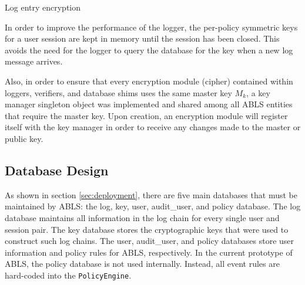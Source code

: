 \documentclass{sig-alternate}
\begin{document}
\begin{algorithm}[h] %
\caption{Log entry encryption} \label{alg:encrypt}
\begin{algorithmic}[1]

\ELSE
\ENDIF
{}
\end{algorithmic}
\end{algorithm}

In order to improve the performance of the logger, the per-policy symmetric keys for a user session are kept
in memory until the session has been closed. This avoids the need for the logger to query the database for the key 
when a new log message arrives. 

Also, in order to ensure that every encryption module (cipher) contained within loggers, verifiers, and database 
shims uses the same master key $M_k$, a key manager singleton object was implemented and shared among
all ABLS entities that require the master key. Upon creation, an encryption module will register itself with the key
manager in order to receive any changes made to the master or public key.

\subsection{Database Design}
\label{sec:databaseDesign}

As shown in section \ref{sec:deployment}, there are five main databases that must be maintained by ABLS:
the log, key, user, audit\_user, and policy database. The log database maintains all information in the log chain for every 
single user and session pair. The key database stores the cryptographic keys that were used to construct
such log chains. The user, audit\_user, and policy databases store user information and policy rules for ABLS, respectively. 
In the current prototype of ABLS, the policy database is not used internally. Instead, all event rules are 
hard-coded into the {\tt PolicyEngine}. 
\end{document}
